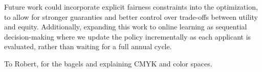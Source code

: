\documentclass[acmlarge]{acmart-ecaf}
\begin{document}
Future work could incorporate explicit fairness constraints into the optimization, to allow for stronger guaranties and better control over trade-offs between utility and equity. Additionally, expanding this work to online learning as sequential decision-making where we update the policy incrementally as each applicant is evaluated, rather than waiting for a full annual cycle.  










\begin{acks}
To Robert, for the bagels and explaining CMYK and color spaces.
\end{acks}



\end{document}
